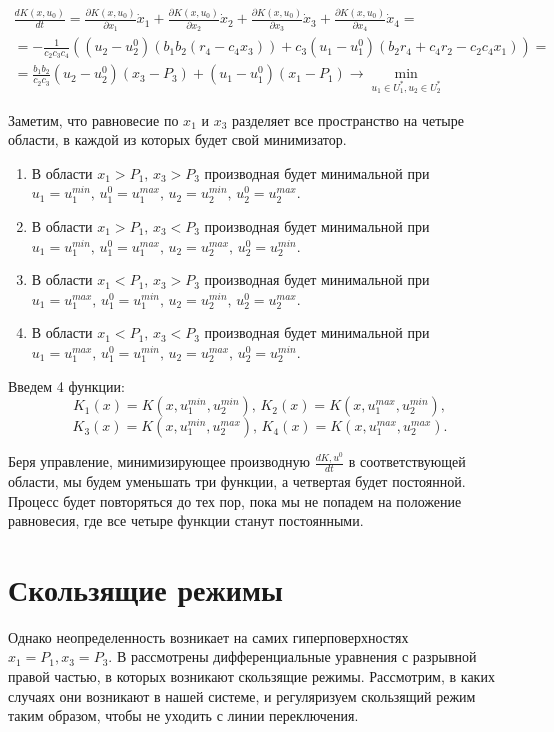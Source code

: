 \documentclass[11pt]{article}
\newcommand\dd[2]{\frac{\partial#1}{\partial#2}}
\begin{document}
\begin{multline*}
    \frac{dK(x,u_0)}{dt} = \dd{K(x,u_0)}{x_1}\dot x_1 + \dd{K(x,u_0)}{x_2}\dot x_2 + \dd{K(x,u_0)}{x_3}\dot x_3 + \dd{K(x,u_0)}{x_4}\dot x_4 = \\
    = -\frac{1}{c_2c_3c_4}\left((u_2 - u_2^0)(b_1b_2(r_4 - c_4x_3)) + c_3(u_1 - u_1^0)(b_2r_4 + c_4r_2 - c_2c_4x_1)\right) = \\
    = \frac{b_1b_2}{c_2c_3}(u_2 - u_2^0)(x_3 - P_3) + (u_1 - u_1^0)(x_1 - P_1) \to \min\limits_{u_1 \in U_1^*, u_2 \in U_2^*}
\end{multline*}

Заметим, что равновесие по $x_1$ и $x_3$ разделяет все пространство на четыре области, в каждой из которых будет свой минимизатор.
\begin{enumerate}
\item
	В области $x_1 > P_1, \, x_3 > P_3$ производная будет минимальной при $u_1 = u_1^{min}, \, u_1^0 = u_1^{max}, \, u_2 = u_2^{min}, \, u_2^0 = u_2^{max}.$
\item
	В области $x_1 > P_1, \, x_3 < P_3$ производная будет минимальной при $u_1 = u_1^{min}, \, u_1^0 = u_1^{max}, \, u_2 = u_2^{max}, \, u_2^0 = u_2^{min}.$
\item
	В области $x_1 < P_1, \, x_3 > P_3$ производная будет минимальной при $u_1 = u_1^{max}, \, u_1^0 = u_1^{min}, \, u_2 = u_2^{min}, \, u_2^0 = u_2^{max}.$
\item
	В области $x_1 < P_1, \, x_3 < P_3$ производная будет минимальной при $u_1 = u_1^{max}, \, u_1^0 = u_1^{min}, \, u_2 = u_2^{max}, \, u_2^0 = u_2^{min}.$
\end{enumerate}

Введем 4 функции:
$$K_1(x) = K(x,u_1^{min}, u_2^{min}), \, K_2(x) = K(x,u_1^{max}, u_2^{min}),$$ 
$$K_3(x) = K(x,u_1^{min}, u_2^{max}), \, K_4(x) = K(x,u_1^{max}, u_2^{max}).$$

Беря управление, минимизирующее производную $\frac{dK, u^0}{dt}$ в соответствующей области, мы будем уменьшать три функции, а четвертая будет постоянной. Процесс будет повторяться до тех пор, пока мы не попадем на положение равновесия, где все четыре функции станут постоянными. 

\section{Скользящие режимы} 
	\indent Однако неопределенность возникает на самих гиперповерхностях $x_1 = P_1, x_3 = P_3.$ В \cite{Filippov} рассмотрены дифференциальные уравнения с разрывной правой частью, в которых возникают скользящие режимы. Рассмотрим, в каких случаях они возникают в нашей системе, и регуляризуем скользящий режим таким образом, чтобы не уходить с линии переключения.
\end{document}
